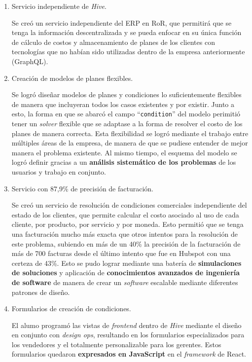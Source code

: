   \begin{enumerate}
    \item Servicio independiente de \textit{Hive}.
    
    Se creó un servicio independiente del ERP en RoR, que permitirá que se tenga la información descentralizada y se pueda enfocar en su única función de cálculo de costos y almacenamiento de planes de los clientes con tecnologías que no habían sido utilizadas dentro de la empresa anteriormente (GraphQL).

    \item Creación de modelos de planes flexibles.

    Se logró diseñar modelos de planes y condiciones lo suficientemente flexibles de manera que incluyeran todos los casos existentes y por existir. Junto a esto, la forma en que se abarcó el campo ``\texttt{condition}'' del modelo perimitió tener un \textit{solver} flexible que se adaptase a la forma de resolver el costo de los planes de manera correcta. Esta flexibilidad se logró mediante el trabajo entre múltiples áreas de la empresa, de manera de que se pudiese entender de mejor manera el problema existente. Al mismo tiempo, el esquema del modelo se logró definir gracias a un \textbf{análisis sistemático de los problemas} de los usuarios y trabajo en conjunto.

    \item Servicio con 87,9\% de precisión de facturación.
    
    Se creó un servicio de resolución de condiciones comerciales independiente del estado de los clientes, que permite calcular el costo asociado al uso de cada cliente, por producto, por servicio y por moneda. Esto permitió que se tenga una facturación mucho más exacta que otros intentos para la resolución de este problema, subiendo en más de un 40\% la precisión de la facturación de más de 700 facturas desde el último intento que fue en Hubspot con una certeza de 43\%. Esto se pudo lograr mediante una batería de \textbf{simulaciones de soluciones} y aplicación de \textbf{conocimientos avanzados de ingeniería de software} de manera de crear un \textit{software} escalable mediante diferentes patrones de diseño.

    \item Formularios de creación de condiciones.

    El alumo programó las vistas de \textit{frontend} dentro de \textit{Hive} mediante el diseño en conjunto con \textit{design ops}, resultando en los formularios especializados para los vendedores y el totalmente personalizable para los gerentes. Estos formularios quedaron \textbf{expresados en JavaScript} en el \textit{framework} de React.
    

\end{enumerate}

